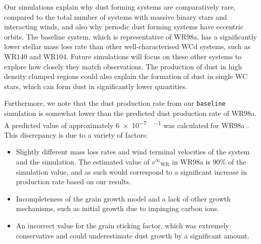 \documentclass[fleqn,usenatbib]{mnras}
\newcommand{\rms}[1]{\ensuremath{_{\text{#1}}}}
\begin{document}
Our simulations explain why dust forming systems are comparatively rare, compared to the total number of systems with massive binary stars and interacting winds, and also why periodic dust forming systems have eccentric orbits.
The baseline system, which is representative of WR98a, has a significantly lower stellar mass loss rate than other well-characterised WCd systems, such as WR140 and WR104.
Future simulations will focus on these other systems
to explore how closely they match observations.
The production of dust in high density clumped regions could also explain the formation of dust in single WC stars, which can form dust in significantly lower quantities.

Furthermore, we note that the dust production rate from our \texttt{baseline} simulation is somewhat lower than the predicted dust production rate of WR98a.
A predicted value of approximately \SI{6e-7}{\solarmass\per\year} was calculated for WR98a \citep{lauRevisitingImpactDust2020}.
This discrepancy is due to a variety of factors:

\begin{itemize}
  \item Slightly different mass loss rates and wind terminal velocities of the system and the simulation. The estimated value of $v^\infty\rms{WR}$ in WR98a is 90\% of the simulation value, and as such would correspond to a significant increase in production rate based on our results.
  \item Incompleteness of the grain growth model and a lack of other growth mechanisms, such as initial growth due to impinging carbon ions.
  \item An incorrect value for the grain sticking factor, which was extremely conservative and could underestimate dust growth by a significant amount.
\end{itemize}
\end{document}
